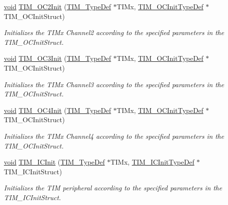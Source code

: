 \begin{DoxyCompactItemize}
\hyperlink{usb__devapi_8h_afabf60e7f57651d6d595a02c75f07cd0}{void} \hyperlink{group___t_i_m___private___functions_ga2017455121d910d6ff63ac6f219842c5}{T\+I\+M\+\_\+\+O\+C2\+Init} (\hyperlink{struct_t_i_m___type_def}{T\+I\+M\+\_\+\+Type\+Def} $\ast$T\+I\+Mx, \hyperlink{struct_t_i_m___o_c_init_type_def}{T\+I\+M\+\_\+\+O\+C\+Init\+Type\+Def} $\ast$T\+I\+M\+\_\+\+O\+C\+Init\+Struct)
\begin{DoxyCompactList}\small\item\em Initializes the T\+I\+Mx Channel2 according to the specified parameters in the T\+I\+M\+\_\+\+O\+C\+Init\+Struct. \end{DoxyCompactList}\item 
\hyperlink{usb__devapi_8h_afabf60e7f57651d6d595a02c75f07cd0}{void} \hyperlink{group___t_i_m___private___functions_ga90d4a358d4e6d4c5ed17dc1d6beb5f30}{T\+I\+M\+\_\+\+O\+C3\+Init} (\hyperlink{struct_t_i_m___type_def}{T\+I\+M\+\_\+\+Type\+Def} $\ast$T\+I\+Mx, \hyperlink{struct_t_i_m___o_c_init_type_def}{T\+I\+M\+\_\+\+O\+C\+Init\+Type\+Def} $\ast$T\+I\+M\+\_\+\+O\+C\+Init\+Struct)
\begin{DoxyCompactList}\small\item\em Initializes the T\+I\+Mx Channel3 according to the specified parameters in the T\+I\+M\+\_\+\+O\+C\+Init\+Struct. \end{DoxyCompactList}\item 
\hyperlink{usb__devapi_8h_afabf60e7f57651d6d595a02c75f07cd0}{void} \hyperlink{group___t_i_m___private___functions_ga64571ebbb58cac39a9e760050175f11c}{T\+I\+M\+\_\+\+O\+C4\+Init} (\hyperlink{struct_t_i_m___type_def}{T\+I\+M\+\_\+\+Type\+Def} $\ast$T\+I\+Mx, \hyperlink{struct_t_i_m___o_c_init_type_def}{T\+I\+M\+\_\+\+O\+C\+Init\+Type\+Def} $\ast$T\+I\+M\+\_\+\+O\+C\+Init\+Struct)
\begin{DoxyCompactList}\small\item\em Initializes the T\+I\+Mx Channel4 according to the specified parameters in the T\+I\+M\+\_\+\+O\+C\+Init\+Struct. \end{DoxyCompactList}\item 
\hyperlink{usb__devapi_8h_afabf60e7f57651d6d595a02c75f07cd0}{void} \hyperlink{group___t_i_m___private___functions_ga9e6a153dd6552e4e1188eba227316f7f}{T\+I\+M\+\_\+\+I\+C\+Init} (\hyperlink{struct_t_i_m___type_def}{T\+I\+M\+\_\+\+Type\+Def} $\ast$T\+I\+Mx, \hyperlink{struct_t_i_m___i_c_init_type_def}{T\+I\+M\+\_\+\+I\+C\+Init\+Type\+Def} $\ast$T\+I\+M\+\_\+\+I\+C\+Init\+Struct)
\begin{DoxyCompactList}\small\item\em Initializes the T\+IM peripheral according to the specified parameters in the T\+I\+M\+\_\+\+I\+C\+Init\+Struct. \end{DoxyCompactList}\item 

\end{DoxyCompactItemize}
